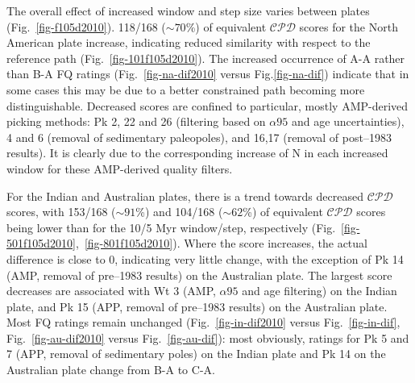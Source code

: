 The overall effect of increased window and step size varies between plates
(Fig.~\ref{fig-f105d2010}). 118/168 (${\sim}70$\%) of equivalent $\mathcal{CPD}$
scores for the North American plate increase, indicating reduced similarity with
respect to the reference path (Fig.~\ref{fig-101f105d2010}). The increased
occurrence of A-A rather than B-A FQ ratings (Fig.~\ref{fig-na-dif2010} versus
Fig.\ref{fig-na-dif}) indicate that in some cases this may be due to a better
constrained path becoming more distinguishable. Decreased scores are confined to
particular, mostly AMP-derived picking methods: Pk 2, 22 and 26 (filtering based
on ${\alpha}95$ and age uncertainties), 4 and 6 (removal of sedimentary
paleopoles), and 16,17 (removal of post–1983 results). It is clearly due to the
corresponding increase of N in each increased window for these AMP-derived
quality filters.

For the Indian and Australian plates, there is a trend towards decreased
$\mathcal{CPD}$ scores, with 153/168 (${\sim}91$\%) and 104/168 (${\sim}62$\%)
of equivalent $\mathcal{CPD}$ scores being lower than for the 10/5 Myr
window/step, respectively (Fig.~\ref{fig-501f105d2010},~\ref{fig-801f105d2010}).
Where the score increases, the actual difference is close to 0, indicating very
little change, with the exception of Pk 14 (AMP, removal of pre–1983 results) on
the Australian plate. The largest score decreases are associated with Wt 3 (AMP,
${\alpha}95$ and age filtering) on the Indian plate, and Pk 15 (APP, removal of
pre–1983 results) on the Australian plate. Most FQ ratings remain unchanged
(Fig.~\ref{fig-in-dif2010} versus Fig.~\ref{fig-in-dif},
Fig.~\ref{fig-au-dif2010} versus Fig.~\ref{fig-au-dif}): most obviously, ratings
for Pk 5 and 7 (APP, removal of sedimentary poles) on the Indian plate and Pk 14
on the Australian plate change from B-A to C-A.

